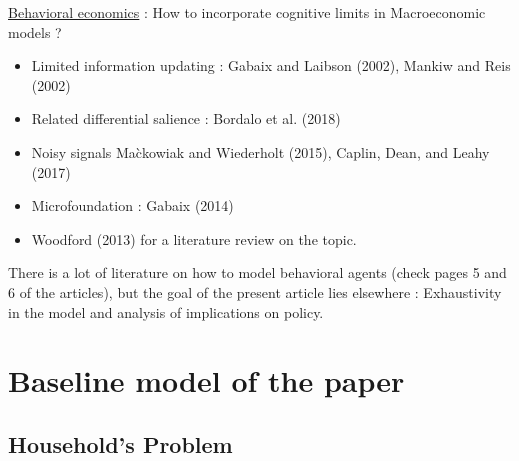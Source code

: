\documentclass{beamer}
\newcommand\ReduceFont{\fontsize{10}{7.2}\selectfont}
\begin{document}
\begin{frame}{\subsecname}
    \underline{Behavioral economics} : How to incorporate cognitive limits in Macroeconomic models ?
    \begin{itemize}
        \item Limited information updating : Gabaix and Laibson (2002), Mankiw and Reis (2002)
        \item Related differential salience : Bordalo et al. (2018)
        \item Noisy signals Ma\`ckowiak and Wiederholt (2015), Caplin, Dean, and Leahy (2017)
        \item Microfoundation : Gabaix (2014)
        \item Woodford (2013) for a literature review on the topic.
    \end{itemize}
    There is a lot of literature on how to model behavioral agents (check pages 5 and 6 of the articles), but the goal of the present article lies elsewhere : Exhaustivity in the model and analysis of implications on policy.
\end{frame}


\section{Baseline model of the paper}
\begin{frame}
    \ReduceFont
\end{frame}

\begin{frame}
    \tableofcontents[currentsection, hideothersubsections, sections=\value{section}]
\end{frame}

\subsection{Household's Problem}
\end{document}
